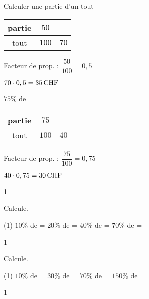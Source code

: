 \documentclass[a4paper,11pt]{report}
\begin{document}
\begin{resolu}{Calculer une partie d'un tout}
{\begin{tasks}
    \begin{minipage}[]{0.3\textwidth}
     \begin{tabular}{|c|c|c|}
         \hline
         partie & $50$ & \\ \hline
         tout & $100$ & $70$ \\ \hline
     \end{tabular}
     \end{minipage}
     \begin{minipage}[]{0.7\textwidth}
        Facteur de prop. : $\dfrac{50}{100}=0,5$
        
        $70\cdot0,5=\tunit{35}{CHF}$
     \end{minipage}
     
    \task $75\%$ de  = \hrulefill %

    \begin{minipage}[]{0.3\textwidth}
     \begin{tabular}{|c|c|c|}
         \hline
         partie & $75$ & \\ \hline
         tout & $100$ & $40$ \\ \hline
     \end{tabular}
     \end{minipage}
     \begin{minipage}[]{0.7\textwidth}
     Facteur de prop. : $\dfrac{75}{100}=0,75$
        
        $40\cdot0,75=\tunit{30}{CHF}$
     \end{minipage}
\end{tasks}
}{1}    
\end{resolu}

\begin{exop}{
Calcule.
\begin{tasks}(1)
    \task $10\%$ de  = \hrulefill
    \task $20\%$ de  = \hrulefill
    \task $40\%$ de  = \hrulefill
    \task $70\%$ de  = \hrulefill
\end{tasks}
}{1}    
\end{exop}

\begin{exop}{
Calcule.
\begin{tasks}(1)
    \task $10\%$ de  = \hrulefill
    \task $30\%$ de  = \hrulefill
    \task $70\%$ de  = \hrulefill
    \task $150\%$ de  = \hrulefill
\end{tasks}
}{1}    
\end{exop}
\end{document}
